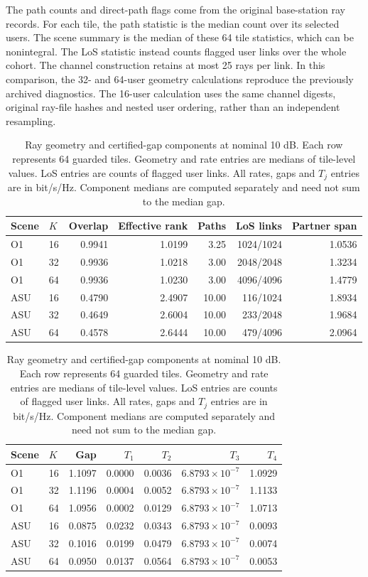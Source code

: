 \documentclass[10pt,letterpaper]{article}
\begin{document}
The path counts and direct-path flags come from the original base-station ray records. For each tile, the path statistic is the median count over its selected users. The scene summary is the median of these 64 tile statistics, which can be nonintegral. The LoS statistic instead counts flagged user links over the whole cohort. The channel construction retains at most 25 rays per link. In this comparison, the 32- and 64-user geometry calculations reproduce the previously archived diagnostics. The 16-user calculation uses the same channel digests, original ray-file hashes and nested user ordering, rather than an independent resampling.

\begin{table}[htbp]
\centering
\caption{Ray geometry and certified-gap components at nominal 10 dB. Each row represents 64 guarded tiles. Geometry and rate entries are medians of tile-level values. LoS entries are counts of flagged user links. All rates, gaps and \(T_j\) entries are in bit/s/Hz. Component medians are computed separately and need not sum to the median gap.}
\label{supp:table6}
\small
\begin{tabular}{llrrrrr}
\hline
Scene & \(K\) & Overlap & Effective rank & Paths & LoS links & Partner span\\
\hline
O1 &16&0.9941&1.0199&3.25&1024/1024&1.0536\\
O1 &32&0.9936&1.0218&3.00&2048/2048&1.3234\\
O1 &64&0.9936&1.0230&3.00&4096/4096&1.4779\\
ASU &16&0.4790&2.4907&10.00&116/1024&1.8934\\
ASU &32&0.4649&2.6004&10.00&233/2048&1.9684\\
ASU &64&0.4578&2.6444&10.00&479/4096&2.0964\\
\hline
\end{tabular}

\medskip
\begin{tabular}{llrrrrr}
\hline
Scene & \(K\) & Gap & \(T_1\) & \(T_2\) & \(T_3\) & \(T_4\)\\
\hline
O1 &16&1.1097&0.0000&0.0036&\(6.8793\times10^{-7}\)&1.0929\\
O1 &32&1.1196&0.0004&0.0052&\(6.8793\times10^{-7}\)&1.1133\\
O1 &64&1.0956&0.0002&0.0129&\(6.8793\times10^{-7}\)&1.0713\\
ASU &16&0.0875&0.0232&0.0343&\(6.8793\times10^{-7}\)&0.0093\\
ASU &32&0.1016&0.0199&0.0479&\(6.8793\times10^{-7}\)&0.0074\\
ASU &64&0.0950&0.0137&0.0564&\(6.8793\times10^{-7}\)&0.0053\\
\hline
\end{tabular}
\end{table}
\end{document}
